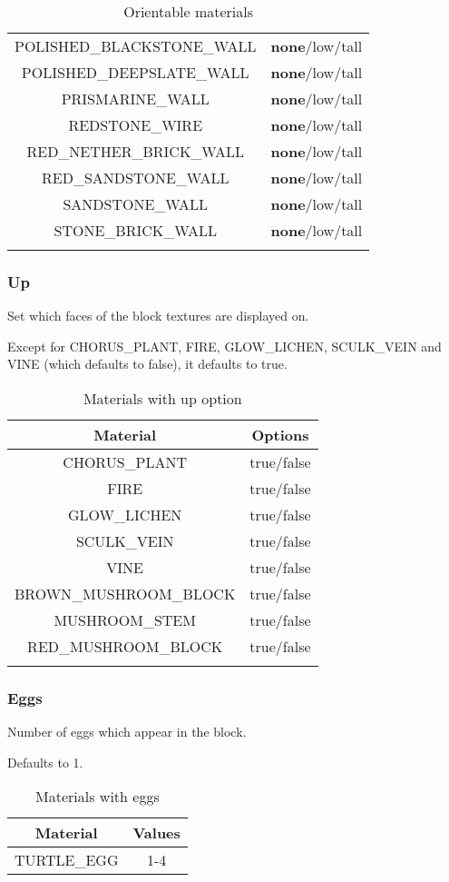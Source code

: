 \begin{longtable}{ |c|c| }
	POLISHED\_BLACKSTONE\_WALL & \textbf{none}/low/tall \\
	POLISHED\_DEEPSLATE\_WALL & \textbf{none}/low/tall \\
	PRISMARINE\_WALL & \textbf{none}/low/tall \\
	REDSTONE\_WIRE & \textbf{none}/low/tall \\
	RED\_NETHER\_BRICK\_WALL & \textbf{none}/low/tall \\
	RED\_SANDSTONE\_WALL & \textbf{none}/low/tall \\
	SANDSTONE\_WALL & \textbf{none}/low/tall \\
	STONE\_BRICK\_WALL & \textbf{none}/low/tall \\
	\hline
	\caption{Orientable materials}
\end{longtable}

\subsubsection{Up}
Set which faces of the block textures are displayed on.

Except for CHORUS\_PLANT, FIRE, GLOW\_LICHEN, SCULK\_VEIN and VINE (which defaults to false), it defaults to true.

\begin{longtable}{ |c|c| }
	\hline
	Material & Options \\
	\hline
	\endhead
	CHORUS\_PLANT & true/false \\
	FIRE & true/false \\
	GLOW\_LICHEN & true/false \\
	SCULK\_VEIN & true/false \\
	VINE & true/false \\
	\hline
	BROWN\_MUSHROOM\_BLOCK & true/false \\
	MUSHROOM\_STEM & true/false \\
	RED\_MUSHROOM\_BLOCK & true/false \\
	\hline
	\caption{Materials with up option}
\end{longtable}

\subsubsection{Eggs}
Number of eggs which appear in the block.

Defaults to 1.

\begin{table}[H]
	\centering
	\begin{tabular}{ |c|c| }
		\hline
		Material & Values \\
		\hline
		TURTLE\_EGG & 1-4 \\
		\hline
	\end{tabular}
	\caption{Materials with eggs}
\end{table}


